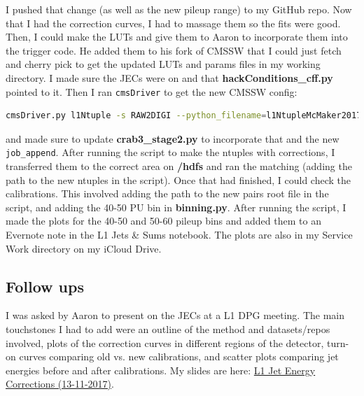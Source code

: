 I pushed that change (as well as the new pileup range) to my GitHub repo. Now that I had the correction curves, I had to massage them so the fits were good. Then, I could make the LUTs and give them to Aaron to incorporate them into the trigger code. He added them to his fork of CMSSW that I could just fetch and cherry pick to get the updated LUTs and params files in my working directory. I made sure the JECs were on and that \textbf{hackConditions\_cff.py} pointed to it. Then I ran \texttt{cmsDriver} to get the new CMSSW config:

\begin{lstlisting}[belowskip=-0.7cm, language=sh, numbers=none]
cmsDriver.py l1Ntuple -s RAW2DIGI --python_filename=l1NtupleMcMaker2017_RAW2DIGI_v3_closureTest.py -n 420 --no_output --era=Run2_2017 --mc --conditions=92X_upgrade2017_realistic_v7 --customise=L1Trigger/Configuration/customiseReEmul.L1TReEmulMCFrom90xRAWSimHcalTP --customise=L1Trigger/L1TNtuples/customiseL1Ntuple.L1NtupleRAWEMUGEN_MC --customise=L1Trigger/Configuration/customiseSettings.L1TSettingsToCaloStage2Params_2017_v1_10_mode_inconsistent --filein=/store/mc/RunIISummer17DRStdmix/QCD_Pt-15to3000_TuneCUETP8M1_Flat_13TeV_pythia8/GEN-SIM-RAW/NZSFlatPU28to62_92X_upgrade2017_realistic_v10-v1/10000/00052042-ED9E-E711-A959-FA163E22945C.root
\end{lstlisting}

and made sure to update \textbf{crab3\_stage2.py} to incorporate that and the new \texttt{job\_append}. After running the script to make the ntuples with corrections, I transferred them to the correct area on \textbf{/hdfs} and ran the matching (adding the path to the new ntuples in the script). Once that had finished, I could check the calibrations. This involved adding the path to the new pairs root file in the script, and adding the 40-50 PU bin in \textbf{binning.py}. After running the script, I made the plots for the 40-50 and 50-60 pileup bins and added them to an Evernote note in the L1 Jets \& Sums notebook. The plots are also in my Service Work directory on my iCloud Drive.


\subsection{Follow ups}

I was asked by Aaron to present on the JECs at a L1 DPG meeting. The main touchstones I had to add were an outline of the method and datasets/repos involved, plots of the correction curves in different regions of the detector, turn-on curves comparing old vs. new calibrations, and scatter plots comparing jet energies before and after calibrations. My slides are here: \href{run:./sec20/20171113 L1 Jet Energy Corrections.pdf}{L1 Jet Energy Corrections (13-11-2017)}.

